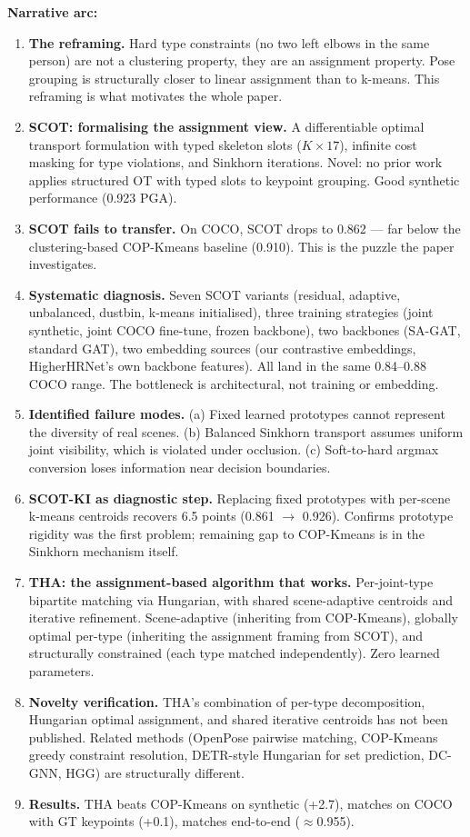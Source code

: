 \textbf{Narrative arc:}
\begin{enumerate}
    \item \textbf{The reframing.} Hard type constraints (no two left elbows in the same person) are not a clustering property, they are an assignment property. Pose grouping is structurally closer to linear assignment than to k-means. This reframing is what motivates the whole paper.
    \item \textbf{SCOT: formalising the assignment view.} A differentiable optimal transport formulation with typed skeleton slots ($K \times 17$), infinite cost masking for type violations, and Sinkhorn iterations. Novel: no prior work applies structured OT with typed slots to keypoint grouping. Good synthetic performance (0.923 PGA).
    \item \textbf{SCOT fails to transfer.} On COCO, SCOT drops to 0.862 --- far below the clustering-based COP-Kmeans baseline (0.910). This is the puzzle the paper investigates.
    \item \textbf{Systematic diagnosis.} Seven SCOT variants (residual, adaptive, unbalanced, dustbin, k-means initialised), three training strategies (joint synthetic, joint COCO fine-tune, frozen backbone), two backbones (SA-GAT, standard GAT), two embedding sources (our contrastive embeddings, HigherHRNet's own backbone features). All land in the same 0.84--0.88 COCO range. The bottleneck is architectural, not training or embedding.
    \item \textbf{Identified failure modes.} (a) Fixed learned prototypes cannot represent the diversity of real scenes. (b) Balanced Sinkhorn transport assumes uniform joint visibility, which is violated under occlusion. (c) Soft-to-hard argmax conversion loses information near decision boundaries.
    \item \textbf{SCOT-KI as diagnostic step.} Replacing fixed prototypes with per-scene k-means centroids recovers 6.5 points (0.861 $\to$ 0.926). Confirms prototype rigidity was the first problem; remaining gap to COP-Kmeans is in the Sinkhorn mechanism itself.
    \item \textbf{THA: the assignment-based algorithm that works.} Per-joint-type bipartite matching via Hungarian, with shared scene-adaptive centroids and iterative refinement. Scene-adaptive (inheriting from COP-Kmeans), globally optimal per-type (inheriting the assignment framing from SCOT), and structurally constrained (each type matched independently). Zero learned parameters.
    \item \textbf{Novelty verification.} THA's combination of per-type decomposition, Hungarian optimal assignment, and shared iterative centroids has not been published. Related methods (OpenPose pairwise matching, COP-Kmeans greedy constraint resolution, DETR-style Hungarian for set prediction, DC-GNN, HGG) are structurally different.
    \item \textbf{Results.} THA beats COP-Kmeans on synthetic (+2.7), matches on COCO with GT keypoints (+0.1), matches end-to-end ($\approx$0.955).
\end{enumerate}

